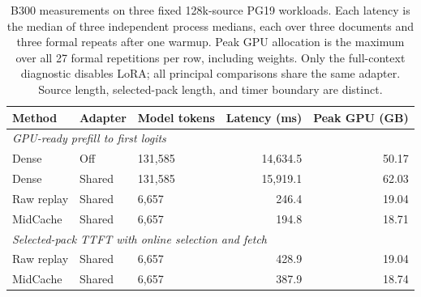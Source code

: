 \begin{table}[htbp]
\centering
\small
\setlength{\tabcolsep}{7pt}
\begin{tabular}{@{}lllrr@{}}
\toprule
Method & Adapter & Model tokens & Latency (ms) & Peak GPU (GB)\\
\midrule
\multicolumn{5}{l}{\textit{GPU-ready prefill to first logits}}\\
Dense & Off & 131,585 & 14,634.5 & 50.17\\
Dense & Shared & 131,585 & 15,919.1 & 62.03\\
Raw replay & Shared & 6,657 & 246.4 & 19.04\\
MidCache & Shared & 6,657 & 194.8 & 18.71\\
\midrule
\multicolumn{5}{l}{\textit{Selected-pack TTFT with online selection and fetch}}\\
Raw replay & Shared & 6,657 & 428.9 & 19.04\\
MidCache & Shared & 6,657 & 387.9 & 18.74\\
\bottomrule
\end{tabular}
\caption{B300 measurements on three fixed 128k-source PG19 workloads. Each latency is the median of three independent process medians, each over three documents and three formal repeats after one warmup. Peak GPU allocation is the maximum over all 27 formal repetitions per row, including weights. Only the full-context diagnostic disables LoRA; all principal comparisons share the same adapter. Source length, selected-pack length, and timer boundary are distinct.}
\label{tab:b300-recheck}
\end{table}
